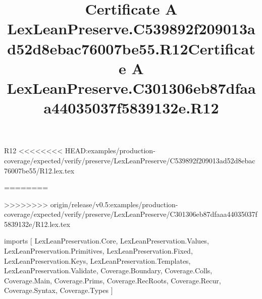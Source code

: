 \begin{lexlean}{R12}
<<<<<<<< HEAD:examples/production-coverage/expected/verify/preserve/LexLeanPreserve/C539892f209013ad52d8ebac76007be55/R12.lex.tex
\title{Certificate A LexLeanPreserve.C539892f209013ad52d8ebac76007be55.R12}
========
\title{Certificate A LexLeanPreserve.C301306eb87dfaaa44035037f5839132e.R12}
>>>>>>>> origin/release/v0.5:examples/production-coverage/expected/verify/preserve/LexLeanPreserve/C301306eb87dfaaa44035037f5839132e/R12.lex.tex
\begin{coremodule}
imports [
  LexLeanPreservation.Core,
  LexLeanPreservation.Values,
  LexLeanPreservation.Primitives,
  LexLeanPreservation.Fixed,
  LexLeanPreservation.Keys,
  LexLeanPreservation.Templates,
  LexLeanPreservation.Validate,
  Coverage.Boundary,
  Coverage.Colls,
  Coverage.Main,
  Coverage.Prims,
  Coverage.RecRoots,
  Coverage.Recur,
  Coverage.Syntax,
  Coverage.Types
]


\end{coremodule}
\end{lexlean}
